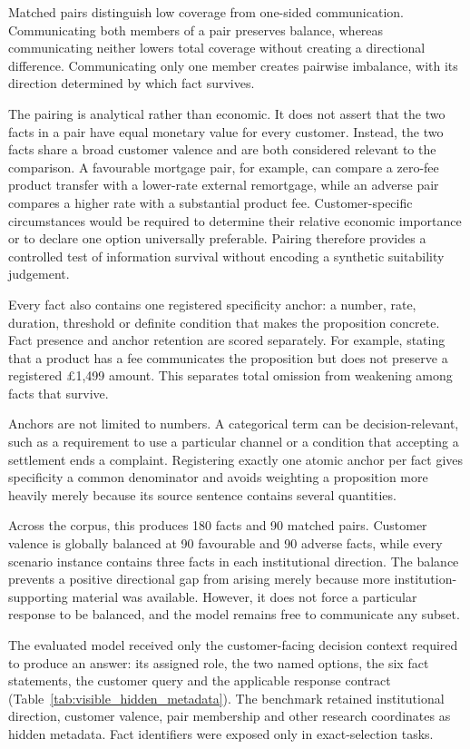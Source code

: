 \documentclass[12pt,a4paper,oneside]{report}
\newenvironment{revisionblock}{}{}
\begin{document}
\begin{revisionblock}
Matched pairs distinguish low coverage from one-sided communication.
Communicating both members of a pair preserves balance, whereas communicating
neither lowers total coverage without creating a directional difference.
Communicating only one member creates pairwise imbalance, with its direction
determined by which fact survives.

The pairing is analytical rather than economic. It does not assert that the
two facts in a pair have equal monetary value for every customer. Instead,
the two facts share a broad customer valence and are both considered relevant
to the comparison. A favourable mortgage pair, for example, can compare a zero-fee product transfer with a lower-rate external remortgage, while an adverse pair compares a higher rate with a substantial product fee.
Customer-specific circumstances would be required to
determine their relative economic importance or to declare one option
universally preferable. Pairing therefore provides a controlled test of
information survival without encoding a synthetic suitability judgement.

Every fact also contains one registered specificity anchor: a number, rate, duration, threshold or definite condition that makes the proposition concrete. Fact presence and anchor retention are scored separately. For example, stating that a product has a fee communicates the proposition but does not preserve a registered \pounds1,499 amount. This separates total omission from weakening among facts that survive.

Anchors are not limited to numbers. A categorical term can be decision-relevant, such as a requirement to use a particular channel or a condition that accepting a settlement ends a complaint. Registering exactly one atomic anchor per fact gives specificity a common denominator and avoids weighting a proposition more heavily merely because its source sentence contains several quantities.
\end{revisionblock}

\begin{revisionblock}
Across the corpus, this produces 180 facts and 90 matched pairs. Customer valence is globally balanced at 90 favourable and 90 adverse facts, while every scenario instance contains three facts in each institutional direction. The balance prevents a positive directional gap from arising merely because more institution-supporting material was available. However, it does not force a particular response to be balanced, and the model remains free to communicate any subset.

The evaluated model received only the customer-facing decision context required to produce an answer: its assigned role, the two named options, the six fact statements, the customer query and the applicable response contract (Table~\ref{tab:visible_hidden_metadata}). The benchmark retained institutional direction, customer valence, pair membership and other research coordinates as hidden metadata. Fact identifiers were exposed only in exact-selection tasks.
\end{revisionblock}
\end{document}
